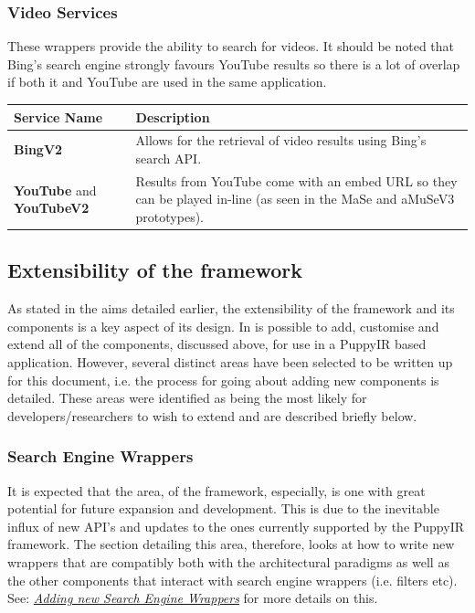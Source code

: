 \documentclass[letterpaper,10pt,english]{sphinxmanual}
\begin{document}
\subsubsection{Video Services}
\label{overview:video-services}
These wrappers provide the ability to search for videos. It should be noted that Bing's search engine strongly favours YouTube results so there is a lot of overlap if both it and YouTube are used in the same application.

\begin{tabulary}{\linewidth}{|L|L|}
\hline
\textbf{
Service Name
} & \textbf{
Description
}\\\hline

\textbf{BingV2}
 & 
Allows for the retrieval of video results using Bing's search API.
\\\hline

\textbf{YouTube} and \textbf{YouTubeV2}
 & 
Results from YouTube come with an embed URL so they can be played in-line (as seen in the MaSe and aMuSeV3 prototypes).
\\\hline
\end{tabulary}



\subsection{Extensibility of the framework}
\label{overview:extensibility-of-the-framework}
As stated in the aims detailed earlier, the extensibility of the framework and its components is a key aspect of its design. In is possible to add, customise and extend all of the components, discussed above, for use in a PuppyIR based application. However, several distinct areas have been selected to be written up for this document, i.e. the process for going about adding new components is detailed. These areas were identified as being the most likely for developers/researchers to wish to extend and are described briefly below.


\subsubsection{Search Engine Wrappers}
\label{overview:id2}
It is expected that the area, of the framework, especially, is one with great potential for future expansion and development. This is due to the inevitable influx of new API's and updates to the ones currently supported by the PuppyIR framework. The section detailing this area, therefore, looks at how to write new wrappers that are compatibly both with the architectural paradigms as well as the other components that interact with search engine wrappers (i.e. filters etc). See: {\hyperref[extendingSearchEngine:extending-the-search-engine]{\emph{Adding new Search Engine Wrappers}}} for more details on this.
\end{document}
